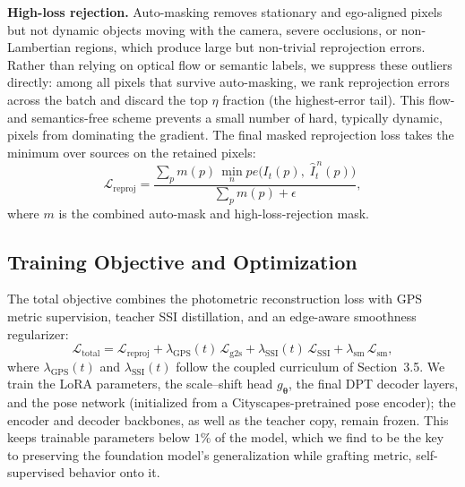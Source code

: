 \textbf{High-loss rejection.} Auto-masking removes stationary and ego-aligned pixels but not dynamic objects moving with the camera, severe occlusions, or non-Lambertian regions, which produce large but non-trivial reprojection errors. Rather than relying on optical flow or semantic labels, we suppress these outliers directly: among all pixels that survive auto-masking, we rank reprojection errors across the batch and discard the top \(\eta\) fraction (the highest-error tail). This flow- and semantics-free scheme prevents a small number of hard, typically dynamic, pixels from dominating the gradient. The final masked reprojection loss takes the minimum over sources on the retained pixels:
\begin{equation}
\mathcal{L}_{\text{reproj}} = \frac{\sum_p m(p)\,\min_{n} pe\!\big(I_t(p),\; \hat I_{t}^{\,n}(p)\big)}{\sum_p m(p) + \epsilon},
\label{eq:Lreproj}
\end{equation}
where \(m\) is the combined auto-mask and high-loss-rejection mask.

\subsection{Training Objective and Optimization}

The total objective combines the photometric reconstruction loss with GPS metric supervision, teacher SSI distillation, and an edge-aware smoothness regularizer:
\begin{equation}
\mathcal{L}_{\text{total}} = \mathcal{L}_{\text{reproj}}
+ \lambda_{\mathrm{GPS}}(t)\,\mathcal{L}_{\mathrm{g2s}}
+ \lambda_{\mathrm{SSI}}(t)\,\mathcal{L}_{\mathrm{SSI}}
+ \lambda_{\mathrm{sm}}\,\mathcal{L}_{\mathrm{sm}},
\end{equation}
where \(\lambda_{\mathrm{GPS}}(t)\) and \(\lambda_{\mathrm{SSI}}(t)\) follow the coupled curriculum of Section~3.5. We train the LoRA parameters, the scale--shift head \(g_{\boldsymbol\theta}\), the final DPT decoder layers, and the pose network (initialized from a Cityscapes-pretrained pose encoder); the encoder and decoder backbones, as well as the teacher copy, remain frozen. This keeps trainable parameters below \(1\%\) of the model, which we find to be the key to preserving the foundation model's generalization while grafting metric, self-supervised behavior onto it.
